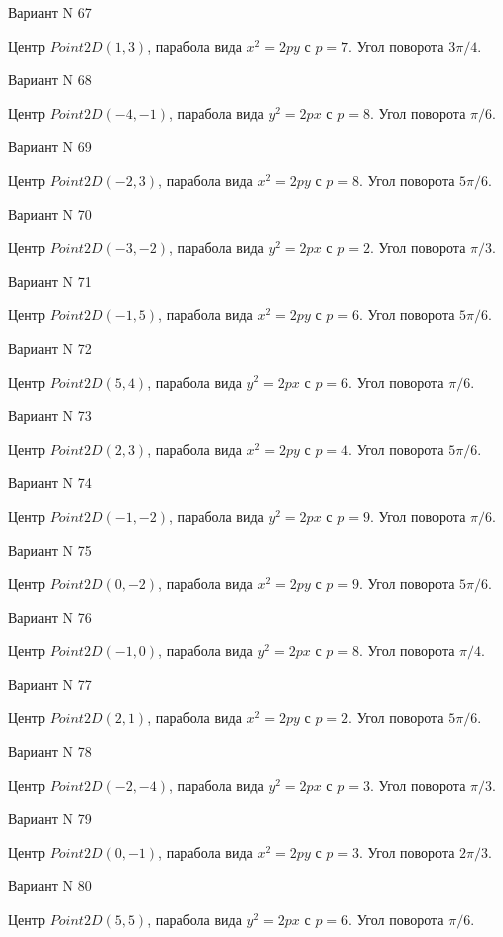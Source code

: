 \documentclass[11pt]{report}
\begin{document}
Вариант N 67

Центр $Point2D\left(1, 3\right)$, парабола вида $x^{2} = 2py$ с $p = 7$. Угол поворота $3 \pi / 4$.

Вариант N 68

Центр $Point2D\left(-4, -1\right)$, парабола вида $y^{2} = 2px$ с $p = 8$. Угол поворота $\pi / 6$.

Вариант N 69

Центр $Point2D\left(-2, 3\right)$, парабола вида $x^{2} = 2py$ с $p = 8$. Угол поворота $5 \pi / 6$.

Вариант N 70

Центр $Point2D\left(-3, -2\right)$, парабола вида $y^{2} = 2px$ с $p = 2$. Угол поворота $\pi / 3$.

Вариант N 71

Центр $Point2D\left(-1, 5\right)$, парабола вида $x^{2} = 2py$ с $p = 6$. Угол поворота $5 \pi / 6$.

Вариант N 72

Центр $Point2D\left(5, 4\right)$, парабола вида $y^{2} = 2px$ с $p = 6$. Угол поворота $\pi / 6$.

Вариант N 73

Центр $Point2D\left(2, 3\right)$, парабола вида $x^{2} = 2py$ с $p = 4$. Угол поворота $5 \pi / 6$.

Вариант N 74

Центр $Point2D\left(-1, -2\right)$, парабола вида $y^{2} = 2px$ с $p = 9$. Угол поворота $\pi / 6$.

Вариант N 75

Центр $Point2D\left(0, -2\right)$, парабола вида $x^{2} = 2py$ с $p = 9$. Угол поворота $5 \pi / 6$.

Вариант N 76

Центр $Point2D\left(-1, 0\right)$, парабола вида $y^{2} = 2px$ с $p = 8$. Угол поворота $\pi / 4$.

Вариант N 77

Центр $Point2D\left(2, 1\right)$, парабола вида $x^{2} = 2py$ с $p = 2$. Угол поворота $5 \pi / 6$.

Вариант N 78

Центр $Point2D\left(-2, -4\right)$, парабола вида $y^{2} = 2px$ с $p = 3$. Угол поворота $\pi / 3$.

Вариант N 79

Центр $Point2D\left(0, -1\right)$, парабола вида $x^{2} = 2py$ с $p = 3$. Угол поворота $2 \pi / 3$.

Вариант N 80

Центр $Point2D\left(5, 5\right)$, парабола вида $y^{2} = 2px$ с $p = 6$. Угол поворота $\pi / 6$.
\end{document}
